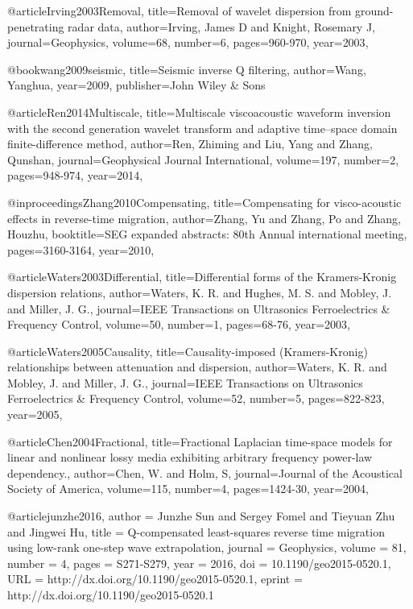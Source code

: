@article{Irving2003Removal,
  title={Removal of wavelet dispersion from ground-penetrating radar data},
  author={Irving, James D and Knight, Rosemary J},
  journal={Geophysics},
  volume={68},
  number={6},
  pages={960-970},
  year={2003},
}

@book{wang2009seismic,
  title={Seismic inverse {Q} filtering},
  author={Wang, Yanghua},
  year={2009},
  publisher={John Wiley \& Sons}
}

@article{Ren2014Multiscale,
  title={Multiscale viscoacoustic waveform inversion with the second generation wavelet transform and adaptive time–space domain finite-difference method},
  author={Ren, Zhiming and Liu, Yang and Zhang, Qunshan},
  journal={Geophysical Journal International},
  volume={197},
  number={2},
  pages={948-974},
  year={2014},
}

@inproceedings{Zhang2010Compensating,
  title={Compensating for visco-acoustic effects in reverse-time migration},
  author={Zhang, Yu and Zhang, Po and Zhang, Houzhu},
  booktitle={SEG expanded abstracts: 80th Annual international meeting},
  pages={3160-3164},
  year={2010},
}

@article{Waters2003Differential,
  title={Differential forms of the Kramers-Kronig dispersion relations},
  author={Waters, K. R. and Hughes, M. S. and Mobley, J. and Miller, J. G.},
  journal={IEEE Transactions on Ultrasonics Ferroelectrics \& Frequency Control},
  volume={50},
  number={1},
  pages={68-76},
  year={2003},
}

@article{Waters2005Causality,
  title={Causality-imposed (Kramers-Kronig) relationships between attenuation and dispersion},
  author={Waters, K. R. and Mobley, J. and Miller, J. G.},
  journal={IEEE Transactions on Ultrasonics Ferroelectrics \& Frequency Control},
  volume={52},
  number={5},
  pages={822-823},
  year={2005},
}

@article{Chen2004Fractional,
  title={Fractional Laplacian time-space models for linear and nonlinear lossy media exhibiting arbitrary frequency power-law dependency.},
  author={Chen, W. and Holm, S},
  journal={Journal of the Acoustical Society of America},
  volume={115},
  number={4},
  pages={1424-30},
  year={2004},
}

@article{junzhe2016,
author = {Junzhe Sun and Sergey Fomel and Tieyuan Zhu and Jingwei Hu},
title = {Q-compensated least-squares reverse time migration using low-rank one-step wave extrapolation},
journal = {Geophysics},
volume = {81},
number = {4},
pages = {S271-S279},
year = {2016},
doi = {10.1190/geo2015-0520.1},
URL = {http://dx.doi.org/10.1190/geo2015-0520.1},
eprint = {http://dx.doi.org/10.1190/geo2015-0520.1}
}

